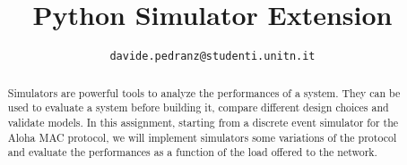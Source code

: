 \documentclass[conference]{IEEEtran}
\begin{document}
\title{Python Simulator Extension}
\author{
	\texttt{davide.pedranz@studenti.unitn.it}
}

\maketitle

\begin{abstract}
Simulators are powerful tools to analyze the performances of a system.
They can be used to evaluate a system before building it, compare different design choices and validate models.
In this assignment, starting from a discrete event simulator for the Aloha MAC protocol, we will implement simulators some variations of the protocol and evaluate the performances as a function of the load offered to the network.
\end{abstract}

\acresetall












% 
% 
\end{document}
